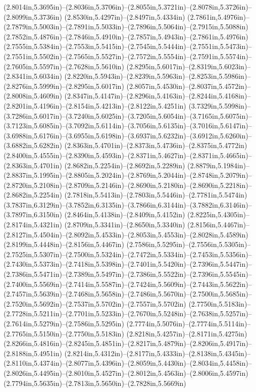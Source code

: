 (2.8014in,5.3695in)--(2.8036in,5.3706in)--(2.8055in,5.3721in)--(2.8078in,5.3726in)--(2.8099in,5.3736in) (2.8530in,5.4297in)--(2.8497in,5.4334in) (2.7861in,5.4976in)--(2.7879in,5.5003in)--(2.7891in,5.5033in)--(2.7896in,5.5064in)--(2.7915in,5.5088in) (2.7852in,5.4876in)--(2.7846in,5.4910in)--(2.7857in,5.4943in)--(2.7861in,5.4976in) (2.7555in,5.5384in)--(2.7553in,5.5415in)--(2.7545in,5.5444in)--(2.7551in,5.5473in)--(2.7551in,5.5502in)--(2.7565in,5.5527in)--(2.7572in,5.5554in)--(2.7591in,5.5574in)--(2.7605in,5.5597in)--(2.7628in,5.5610in) (2.8295in,5.6017in)--(2.8319in,5.6023in)--(2.8341in,5.6034in) (2.8220in,5.5943in)--(2.8239in,5.5963in)--(2.8253in,5.5986in)--(2.8276in,5.5999in)--(2.8295in,5.6017in) (2.8057in,5.4530in)--(2.8037in,5.4572in)--(2.8008in,5.4609in) (2.8347in,5.4147in)--(2.8296in,5.4163in)--(2.8244in,5.4168in)--(2.8201in,5.4196in)--(2.8154in,5.4213in)--(2.8122in,5.4251in) (3.7329in,5.5998in)--(3.7286in,5.6017in)--(3.7240in,5.6025in)--(3.7205in,5.6054in)--(3.7165in,5.6075in)--(3.7123in,5.6085in)--(3.7092in,5.6114in)--(3.7056in,5.6135in)--(3.7016in,5.6147in)--(3.6988in,5.6176in)--(3.6955in,5.6198in)--(3.6937in,5.6232in)--(3.6912in,5.6260in)--(3.6882in,5.6282in) (2.8363in,5.4701in)--(2.8373in,5.4736in)--(2.8375in,5.4772in) (2.8400in,5.4555in)--(2.8390in,5.4593in)--(2.8371in,5.4627in)--(2.8371in,5.4665in)--(2.8363in,5.4701in) (2.8682in,5.2254in)--(2.8692in,5.2289in) (2.8879in,5.1984in)--(2.8837in,5.1995in)--(2.8805in,5.2024in)--(2.8769in,5.2044in)--(2.8748in,5.2079in)--(2.8720in,5.2108in)--(2.8709in,5.2146in)--(2.8690in,5.2180in)--(2.8690in,5.2218in)--(2.8682in,5.2254in) (2.7818in,5.5413in)--(2.7803in,5.5446in)--(2.7781in,5.5474in) (3.7837in,6.3129in)--(3.7852in,6.3135in)--(3.7866in,6.3144in)--(3.7882in,6.3146in)--(3.7897in,6.3150in) (2.8464in,5.4138in)--(2.8409in,5.4152in) (2.8225in,5.4305in)--(2.8174in,5.4321in) (2.8709in,5.3341in)--(2.8650in,5.3340in) (2.8156in,5.4467in)--(2.8127in,5.4504in)--(2.8092in,5.4533in)--(2.8053in,5.4553in)--(2.8028in,5.4589in) (2.8199in,5.4448in)--(2.8156in,5.4467in) (2.7586in,5.5295in)--(2.7556in,5.5305in)--(2.7525in,5.5307in)--(2.7500in,5.5324in)--(2.7472in,5.5334in)--(2.7453in,5.5356in)--(2.7430in,5.5373in)--(2.7418in,5.5398in)--(2.7401in,5.5420in)--(2.7396in,5.5447in)--(2.7386in,5.5471in)--(2.7389in,5.5497in)--(2.7386in,5.5522in)--(2.7396in,5.5545in)--(2.7400in,5.5569in)--(2.7414in,5.5587in)--(2.7424in,5.5609in)--(2.7443in,5.5622in)--(2.7457in,5.5639in)--(2.7468in,5.5658in)--(2.7486in,5.5670in)--(2.7500in,5.5685in)--(2.7520in,5.5692in)--(2.7537in,5.5702in)--(2.7557in,5.5702in) (2.7750in,5.5183in)--(2.7728in,5.5211in)--(2.7701in,5.5233in)--(2.7670in,5.5248in)--(2.7638in,5.5257in)--(2.7614in,5.5279in)--(2.7586in,5.5295in) (2.7774in,5.5076in)--(2.7774in,5.5114in)--(2.7765in,5.5150in)--(2.7750in,5.5183in) (2.8218in,5.4257in)--(2.8171in,5.4275in) (2.8266in,5.4816in)--(2.8245in,5.4851in)--(2.8217in,5.4879in)--(2.8206in,5.4917in)--(2.8188in,5.4951in) (2.8214in,5.4312in)--(2.8177in,5.4333in)--(2.8138in,5.4345in)--(2.8110in,5.4374in)--(2.8077in,5.4396in)--(2.8059in,5.4430in)--(2.8034in,5.4458in)--(2.8026in,5.4495in)--(2.8010in,5.4527in)--(2.8012in,5.4563in)--(2.8006in,5.4597in) (2.7794in,5.5635in)--(2.7813in,5.5650in)--(2.7828in,5.5669in) 